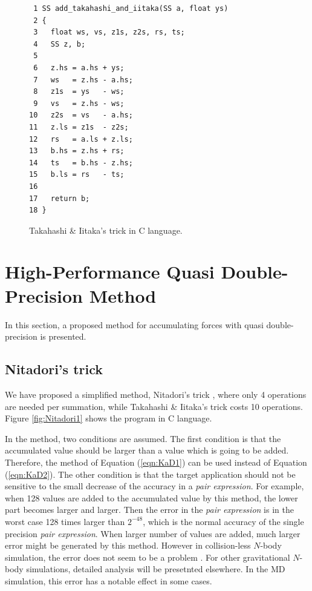 \begin{figure}
\begin{center}\footnotesize
\begin{minipage}{100mm}\def\baselinestretch{0.8}
\vspace*{-3mm}
\begin{verbatim}
 1 SS add_takahashi_and_iitaka(SS a, float ys)
 2 {
 3   float ws, vs, z1s, z2s, rs, ts;
 4   SS z, b;
 5 
 6   z.hs = a.hs + ys;
 7   ws   = z.hs - a.hs;
 8   z1s  = ys   - ws;
 9   vs   = z.hs - ws;
10   z2s  = vs   - a.hs;
11   z.ls = z1s  - z2s;
12   rs   = a.ls + z.ls;
13   b.hs = z.hs + rs;
14   ts   = b.hs - z.hs;
15   b.ls = rs   - ts;
16 
17   return b;
18 }
\end{verbatim}\def\baselinestretch{1.0}
\end{minipage}
\caption{Takahashi \& Iitaka's trick in C language.}
\label{fig:TaI}
\end{center}
\end{figure}

\section{High-Performance Quasi Double-Precision Method}\label{sec:propose}

In this section, a proposed method for accumulating forces with
quasi double-precision is presented. 

\subsection{Nitadori's trick}

We have proposed a simplified method, Nitadori's trick
\cite{Nitadori}, where only 4 operations are needed per summation,
while Takahashi \& Iitaka's trick costs 10 operations.  Figure
\ref{fig:Nitadori1} shows the program in C language.

In the method, two conditions are assumed. The first condition is that
the accumulated value should be larger than a value which is going to
be added. Therefore, the method of Equation (\ref{eqn:KaD1}) can be
used instead of Equation (\ref{eqn:KaD2}). The other condition is that
the target application should not be sensitive to the small decrease
of the accuracy in a {\it pair expression}.  For example, when 128
values are added to the accumulated value by this method, the lower
part becomes larger and larger.  Then the error in the {\it pair
expression} is in the worst case 128 times larger than $2^{-48}$,
which is the normal accuracy of the single precision {\it pair
expression}. When larger number of values are added, much larger error
might be generated by this method. However in collision-less $N$-body
simulation, the error does not seem to be a problem
\cite{Hamada1}. For other gravitational $N$-body simulations, detailed
analysis will be presetnted elsewhere.  In the MD simulation,
this error has a notable effect in some cases.

